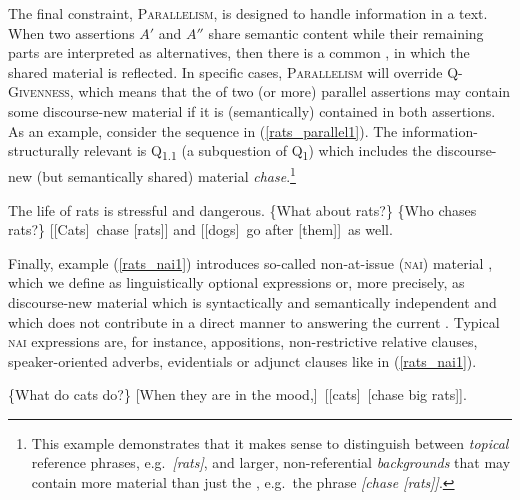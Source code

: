 \documentclass[output=paper,
,modfonts
,nonflat]{langsci/langscibook}
\begin{document}
\noindent The final constraint, \textsc{Parallelism}, is designed to handle  information in a text. When two assertions $A'$ and $A''$ share semantic content while their remaining parts are interpreted as alternatives, then there is a common , in which the shared material is reflected. In specific cases, \textsc{Parallelism} will override \textsc{Q-Givenness}, which means that the  of two (or more) parallel assertions may contain some discourse-new material if it is (semantically) contained in both assertions. As an example, consider the sequence in (\ref{rats_parallel1}). The information-structurally relevant  is Q\textsubscript{{1.1}} (a subquestion of Q\textsubscript{1}) which includes the discourse-new (but semantically shared) material \textit{chase}.\footnote{This example demonstrates that it makes sense to distinguish between \textit{topical} reference phrases, e.g.\ \textit{[rats]\topic}, and larger, non-referential \textit{backgrounds} that may contain more material than just the , e.g.\ the phrase \textit{[chase [rats]\topic]}.}

\begin{exe}
\ex\label{rats_parallel1}
\begin{xlist}
 The life of rats is stressful and dangerous.
 \{What about rats?\}
 \{Who chases rats?\}
 {[[Cats]\focus\ chase [rats]\topic]\sq}
 {and [[dogs]\focus\ go after [them]\topic]\sq\ as well.}
\end{xlist}
\end{exe}

\noindent Finally, example (\ref{rats_nai1}) introduces so-called non-at-issue (\textsc{nai}) material \citep{potch05}, which we define as linguistically optional expressions or, more precisely, as discourse-new material which is syntactically and semantically independent and which does not contribute in a direct manner to answering the current . Typical \textsc{nai} expressions are, for instance, appositions, non-restrictive relative clauses, speaker-oriented adverbs, evidentials or adjunct clauses like in (\ref{rats_nai1}).

\begin{exe}
\ex\label{rats_nai1}
\begin{xlist}
 \{What do cats do?\}
 {[When they are in the mood,]\nai\ [[cats]\topic\ [chase big rats]\focus]\sq.}
\end{xlist}
\end{exe}
\end{document}

